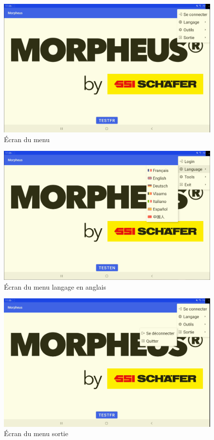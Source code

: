 \documentclass[a4paper, 12pt, french]{article}
\begin{document}
			\vfill

			\begin{figure}[h!]
				\begin{center}
					\includegraphics[width=0.7\linewidth]{application/menu.PNG}
				\end{center}
				\caption{Écran du menu}
				\label{fig:applications:menu}
			\end{figure}	

		\newpage

			\begin{figure}[h!]
				\begin{center}
					\includegraphics[width=0.7\linewidth]{application/menu_en_language.PNG}
				\end{center}
				\caption{Écran du menu langage en anglais}
				\label{fig:applications:menu_en_language}
			\end{figure}	

			\vfill

			\begin{figure}[h!]
				\begin{center}
					\includegraphics[width=0.7\linewidth]{application/menu_exit.PNG}
				\end{center}
				\caption{Écran du menu sortie}
				\label{fig:applications:menu_exit}
			\end{figure}	
\end{document}
